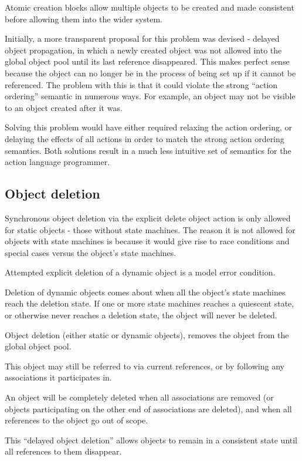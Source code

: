 Atomic creation blocks allow multiple objects to be created and made consistent
before allowing them into the wider system.

Initially, a more transparent proposal for this problem was devised -
\textsf{delayed object propagation}, in which a newly created object was not
allowed into the global object pool until its last reference disappeared. This
makes perfect sense because the object can no longer be in the process of being
set up if it cannot be referenced. The problem with this is that it could
violate the strong ``action ordering'' semantic in numerous ways. For example,
an object may not be visible to an object created after it was.

Solving this problem would have either required relaxing the action ordering,
or delaying the effects of all actions in order to match the strong action
ordering semantics. Both solutions result in a much less intuitive set of
semantics for the action language programmer.

\subsection{Object deletion}
\label{sec:objectDeletion}

Synchronous object deletion via the explicit \textsf{delete object} action is
only allowed for static objects - those without state machines. The reason it
is not allowed for objects with state machines is because it would give rise to
race conditions and special cases versus the object's state machines.

Attempted explicit deletion of a dynamic object is a model error condition.

Deletion of dynamic objects comes about when all the object's state
machines reach the deletion state. If one or more state machines reaches
a quiescent state, or otherwise never reaches a deletion state, the object
will never be deleted.

Object deletion (either static or dynamic objects), removes the object from
the global object pool.

This object may still be referred to via current references, or by following
any associations it participates in.

An object will be completely deleted when all associations are removed (or
objects participating on the other end of associations are deleted), and
when all references to the object go out of scope.

This ``delayed object deletion'' allows objects to remain in a consistent
state until all references to them disappear. 

